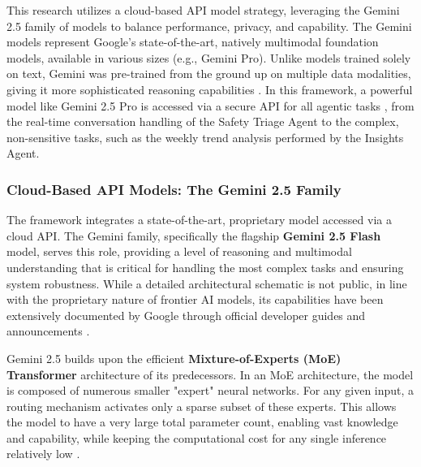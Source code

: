 This research utilizes a cloud-based API model strategy, leveraging the Gemini 2.5 family of models to balance performance, privacy, and capability. The Gemini models represent Google's state-of-the-art, natively multimodal foundation models, available in various sizes (e.g., Gemini Pro). Unlike models trained solely on text, Gemini was pre-trained from the ground up on multiple data modalities, giving it more sophisticated reasoning capabilities \cite{google2025gemini2_5}. In this framework, a powerful model like Gemini 2.5 Pro is accessed via a secure API for all agentic tasks \cite{gemini_api_docs}, from the real-time conversation handling of the Safety Triage Agent to the complex, non-sensitive tasks, such as the weekly trend analysis performed by the Insights Agent.

\subsubsection{Cloud-Based API Models: The Gemini 2.5 Family}

The framework integrates a state-of-the-art, proprietary model accessed via a cloud API. The Gemini family, specifically the flagship \textbf{Gemini 2.5 Flash} model, serves this role, providing a level of reasoning and multimodal understanding that is critical for handling the most complex tasks and ensuring system robustness. While a detailed architectural schematic is not public, in line with the proprietary nature of frontier AI models, its capabilities have been extensively documented by Google through official developer guides and announcements \cite{google2025gemini2_5,gemini_api_docs}.

Gemini 2.5 builds upon the efficient \textbf{Mixture-of-Experts (MoE) Transformer} architecture of its predecessors. In an MoE architecture, the model is composed of numerous smaller "expert" neural networks. For any given input, a routing mechanism activates only a sparse subset of these experts. This allows the model to have a very large total parameter count, enabling vast knowledge and capability, while keeping the computational cost for any single inference relatively low \cite{google2025gemini2_5}.

